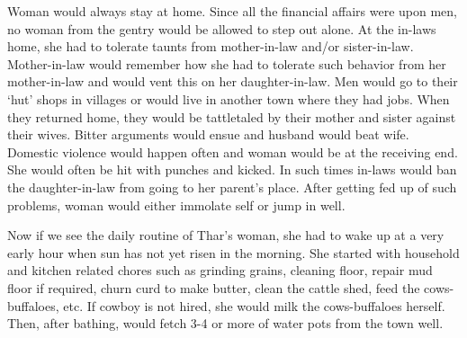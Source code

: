 Woman would always stay at home. Since all the financial affairs were upon men,
no woman from the gentry would be allowed to step out alone. At the in-laws
home, she had to tolerate taunts from mother-in-law and/or sister-in-law.
Mother-in-law would remember how she had to tolerate such behavior from her
mother-in-law and would vent this on her daughter-in-law. Men would go to their
`hut' shops in villages or would live in another town where they had jobs. When
they returned home, they would be tattletaled by their mother and sister
against their wives. Bitter arguments would ensue and husband would beat wife.
Domestic violence would happen often and woman would be at the receiving end.
She would often be hit with punches and kicked. In such times in-laws would ban
the daughter-in-law from going to her parent's place. After getting fed up of
such problems, woman would either immolate self or jump in well.

Now if we see the daily routine of Thar's woman, she had to wake up at a very
early hour when sun has not yet risen in the morning. She started with
household and kitchen related chores such as grinding grains, cleaning floor,
repair mud floor if required, churn curd to make butter, clean the cattle shed,
feed the cows-buffaloes, etc. If cowboy is not hired, she would milk the
cows-buffaloes herself. Then, after bathing, would fetch 3-4 or more of water
pots from the town well.
